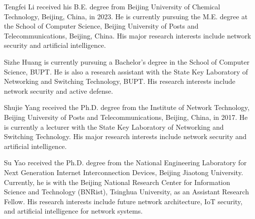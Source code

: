 \documentclass[lettersize,journal]{IEEEtran}
\begin{document}
\vspace{11pt}

\begin{IEEEbiography}{Tengfei Li} received his B.E. degree from Beijing University of Chemical Technology, Beijing, China, in 2023. He is currently pursuing the M.E. degree at the School of Computer Science, Beijing University of Posts and Telecommunications, Beijing, China. His major research interests include network security and artificial intelligence.
\end{IEEEbiography}

\vspace{11pt}

\begin{IEEEbiography}{Sizhe Huang} is currently pursuing a Bachelor's degree in the School of Computer Science, BUPT. He is also a research assistant with the State Key Laboratory of Networking and Switching Technology, BUPT. His research interests include network security and active defense.  
\end{IEEEbiography}

\vspace{11pt}



\begin{IEEEbiography}{Shujie Yang} received the Ph.D. degree from the Institute of Network Technology, Beijing University of Posts and Telecommunications, Beijing, China, in 2017. He is currently a lecturer with the State Key Laboratory of Networking and Switching Technology. His major research interests include network security and artificial intelligence.
\end{IEEEbiography}

\begin{IEEEbiography}{Su Yao} received the Ph.D. degree from the National Engineering Laboratory for Next Generation Internet Interconnection Devices, Beijing Jiaotong University. Currently, he is with the Beijing National Research Center for Information Science and Technology (BNRist), Tsinghua University, as an Assistant Research Fellow. His research interests include future network architecture, IoT security, and artificial intelligence for network systems.
\end{IEEEbiography}
\end{document}
